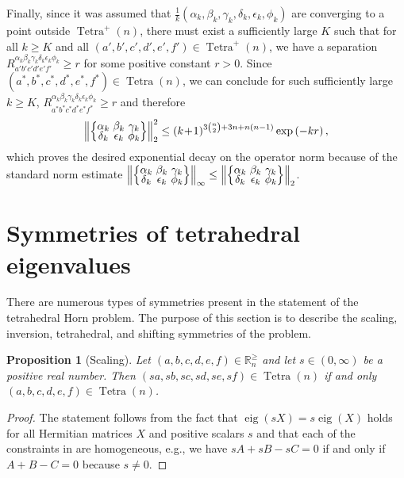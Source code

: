 \documentclass[pdflatex, sn-mathphys-num]{sn-jnl} %
\theoremstyle{plain}
\newtheorem{prop}[thm]{Proposition}
\theoremstyle{definition}
\let\cref\crtcref
\DeclareMathOperator{\Tetra}{Tetra}
\DeclareMathOperator{\eig}{eig}
\newcommand{\polyk}[1]{(k\!+\!1)^{#1}}
\newcommand{\norm}[1]{\left\lVert#1\right\rVert}
\newcommand{\eigs}[1]{\mathbb R^{\geq}_{#1}}
\newcommand{\ea}{a}
\newcommand{\eb}{b}
\newcommand{\ec}{c}
\newcommand{\ed}{d}
\newcommand{\ee}{e}
\newcommand{\ef}{f}
\newcommand{\ya}{\alpha}
\newcommand{\yb}{\beta}
\newcommand{\yc}{\gamma}
\newcommand{\yd}{\delta}
\newcommand{\ye}{\epsilon}
\newcommand{\yf}{\phi}
\newcommand{\tightcurlysixj}[1]{
\begingroup
\arraycolsep=1.5pt
\renewcommand{\arraystretch}{0.3}
\left\{\!\begin{array}{ccc}
    #1
\end{array}\!\right\}
\endgroup
}
\newcommand{\abcdefsymbolk}{\tightcurlysixj{\alpha_k & \beta_k & \gamma_k \\ \delta_k & \epsilon_k & \phi_k}}
\begin{document}
Finally, since it was assumed that $\frac{1}{k}(\ya_k,\yb_k,\yc_k,\yd_k,\ye_k,\yf_k)$ are converging to a point outside $\Tetra^{+}(n)$, there must exist a sufficiently large $K$ such that for all $k \geq K$ and all $(\ea',\eb',\ec',\ed',\ee',\ef') \in \Tetra^{+}(n)$, we have a separation $R_{\ea'\eb'\ec'\ed'\ee'\ef'}^{\ya_k\yb_k\yc_k\yd_k\ye_k\yf_k} \geq r$ for some positive constant $r > 0$.
Since $(\ea^{*},\eb^{*},\ec^{*},\ed^{*},\ee^{*},\ef^{*}) \in \Tetra(n)$, we can conclude for such sufficiently large $k \geq K$, $R_{\ea^{*}\eb^{*}\ec^{*}\ed^{*}\ee^{*}\ef^{*}}^{\ya_k\yb_k\yc_k\yd_k\ye_k\yf_k} \geq r$ and therefore
\begin{equation}
    \norm{\abcdefsymbolk}_{2}^{2} \leq \polyk{3\binom{n}{2}+3n + n(n-1)}  \exp\left( - k r\right),
\end{equation}
which proves the desired exponential decay on the operator norm because of the standard norm estimate $\norm{\abcdefsymbolk}_{\infty} \leq \norm{\abcdefsymbolk}_{2}$.

\appendix

\section{Symmetries of tetrahedral eigenvalues}
\label{sec:symmetries}

There are numerous types of symmetries present in the statement of the tetrahedral Horn problem.
The purpose of this section is to describe the scaling, inversion, tetrahedral, and shifting symmetries of the problem.

\begin{prop}[Scaling]
    \label{prop:scaling}
    Let $(\ea, \eb, \ec, \ed, \ee, \ef) \in \eigs{n}$ and let $s \in (0, \infty)$ be a positive real number.
    Then $(s\ea, s\eb, s\ec, s\ed, s\ee, s\ef) \in \Tetra(n)$ if and only $(\ea, \eb, \ec, \ed, \ee, \ef) \in \Tetra(n)$.
\end{prop}
\begin{proof}
    The statement follows from the fact that $\eig(s X) = s \eig(X)$ holds for all Hermitian matrices $X$ and positive scalars $s$ and that each of the constraints in \cref{eq:tet_cond} are homogeneous, e.g., we have $sA+sB-sC=0$ if and only if $A+B-C=0$ because $s \neq 0$.
\end{proof}
\end{document}
